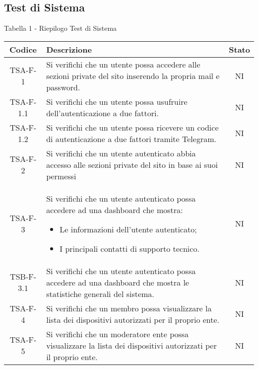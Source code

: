	\subsection{Test di Sistema}
		\begin{center}
		Tabella 1 - Riepilogo Test di Sistema
			\begin{longtable}{|c|p{10cm}|c|}
			\hline
			\rowcolor{lighter-grayer}
			\textbf{Codice} & \textbf{Descrizione} & \textbf{Stato}  \\ %

			\hline
			\endhead

	
			\hline
			 TSA-F-1 & Si verifichi che un utente possa accedere alle sezioni private del sito inserendo la propria mail e password.
			  & NI \\
			 \hline
			 TSA-F-1.1 & Si verifichi che un utente possa usufruire dell'autenticazione a due fattori. & NI \\
			 \hline
			 TSA-F-1.2 & Si verifichi che un utente possa ricevere un codice di autenticazione a due fattori tramite Telegram. & NI \\
			 \hline
			 TSA-F-2 & Si verifichi che un utente autenticato abbia accesso alle sezioni private del sito in base ai suoi permessi & NI \\
			 \hline
			 TSA-F-3 & Si verifichi che un utente autenticato possa accedere ad una dashboard che mostra:
			 \begin{itemize}
			 	\item Le informazioni dell'utente autenticato;
			 	\item I principali contatti di supporto tecnico.
			 \end{itemize} & NI \\
			 \hline
			 TSB-F-3.1 & Si verifichi che un utente autenticato possa accedere ad una dashboard che mostra le statistiche generali del sistema. & NI \\
			 \hline
			 TSA-F-4 & Si verifichi che un membro possa visualizzare la lista dei dispositivi autorizzati per il proprio ente. & NI \\
			 \hline
			 TSA-F-5 & Si verifichi che un moderatore ente possa visualizzare la lista dei dispositivi autorizzati per il proprio ente. & NI \\

\end{longtable}
\end{center}
